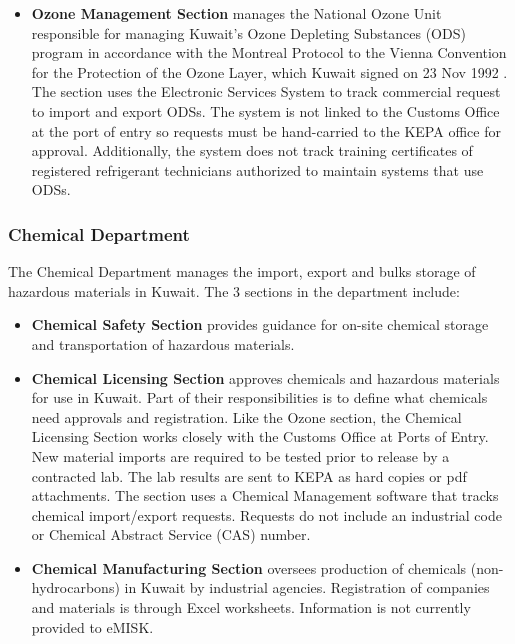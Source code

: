 \begin{itemize}
\item \textbf{Ozone Management Section} manages the National Ozone Unit responsible for managing Kuwait's Ozone Depleting Substances (ODS) program in accordance with the Montreal Protocol to the Vienna Convention for the Protection of the Ozone Layer, which Kuwait signed on 23 Nov 1992 \citep{un1987}.  The section uses the Electronic Services System to track commercial request to import and export ODSs. The system is not linked to the Customs Office at the port of entry so requests must be hand-carried to the KEPA office for approval. Additionally, the system does not track training certificates of registered refrigerant technicians authorized to maintain systems that use ODSs.
\end{itemize}

\subsubsection{Chemical  Department}
The Chemical Department manages the import, export and bulks storage of hazardous materials in Kuwait. The 3 sections in the department include:

\begin{itemize}
\item \textbf{Chemical Safety Section} provides guidance for on-site chemical storage and transportation of hazardous materials.

\item \textbf{Chemical  Licensing Section} approves chemicals and hazardous materials for use in Kuwait. Part of their responsibilities is to define what chemicals need approvals and registration.  Like the Ozone section, the Chemical Licensing Section works closely with the Customs Office at Ports of Entry. New material imports are required to be tested prior to release by a contracted lab. The lab results are sent to KEPA as hard copies or pdf attachments. The section uses a Chemical Management software that tracks chemical import/export requests. Requests do not include an industrial code or Chemical Abstract Service (CAS) number.

\item \textbf{Chemical  Manufacturing Section} oversees production of chemicals (non-hydrocarbons) in Kuwait by industrial agencies. Registration of companies and materials is through Excel worksheets. Information is not currently provided to eMISK.

\end{itemize}


